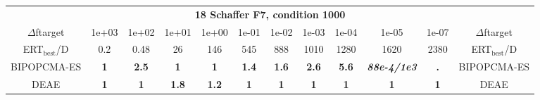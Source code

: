 \begin{tabular}{cccccccccccc}
 & \multicolumn{10}{c}{{\normalsize \textbf{18 Schaffer F7, condition 1000}}}\\
$\Delta$ftarget& 1e+03& 1e+02& 1e+01& 1e+00& 1e-01& 1e-02& 1e-03& 1e-04& 1e-05& 1e-07 & $\Delta$ftarget \\
ERT$_{\textrm{best}}$/D& 0.2& 0.48& 26& 146& 545& 888& 1010& 1280& 1620& 2380 & ERT$_{\textrm{best}}$/D \\
\hline
BIPOPCMA-ES & \textbf{1} & \textbf{2.5} & \textbf{1} & \textbf{1} & \textbf{1.4} & \textbf{1.6} & \textbf{2.6} & \textbf{5.6} & \textbf{\textit{88e-4}\textit{/1e3}} & \textbf{.} & BIPOPCMA-ES \cite{add_an_entry_for_BIPOPCMA-ES_in_bbob.bib}\\
DEAE & \textbf{1} & \textbf{1} & \textbf{1.8} & \textbf{1.2} & \textbf{1} & \textbf{1} & \textbf{1} & \textbf{1} & \textbf{1} & \textbf{1} & DEAE \cite{add_an_entry_for_DEAE_in_bbob.bib}
\end{tabular}
